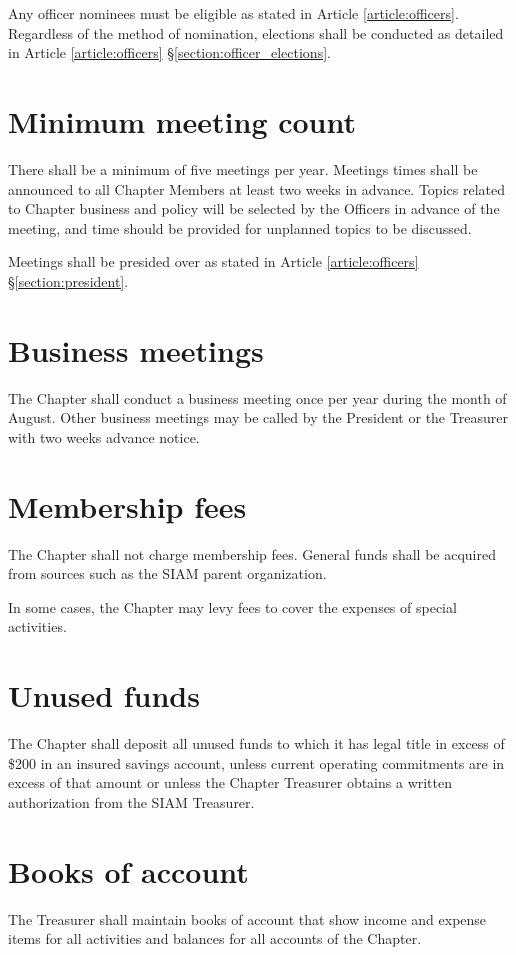 \documentclass{ronr-bylaws}
\newcommand{\refsection}[2]{Article \ref{#1} \S \ref{#2}}
\newcommand{\refarticle}[1]{Article \ref{#1}}
\begin{document}
Any officer nominees must be eligible as stated in \refarticle{article:officers}. Regardless of the method of nomination, elections shall be conducted as detailed in \refsection{article:officers}{section:officer_elections}.

\section{Minimum meeting count}
There shall be a minimum of five meetings per year. Meetings times shall be announced
to all Chapter Members at least two weeks in advance. Topics related to Chapter business and
policy will be selected by the Officers in advance of the meeting, and time should be provided for
unplanned topics to be discussed.

Meetings shall be presided over as stated in \refsection{article:officers}{section:president}.

\section{Business meetings}
The Chapter shall conduct a business meeting once per year during the month of
August. Other business meetings may be called by the President or the Treasurer with two weeks
advance notice.
%
\section{Membership fees}
The Chapter shall not charge membership fees. General funds shall be acquired from
sources such as the SIAM parent organization.

In some cases, the Chapter may levy fees to cover the expenses of special activities.

\section{Unused funds}
The Chapter shall deposit all unused funds to which it has legal title in excess of \$200
in an insured savings account, unless current operating commitments are in excess of that amount
or unless the Chapter Treasurer obtains a written authorization from the SIAM Treasurer.

\section{Books of account}
The Treasurer shall maintain books of account that show income and expense items
for all activities and balances for all accounts of the Chapter.
\end{document}
